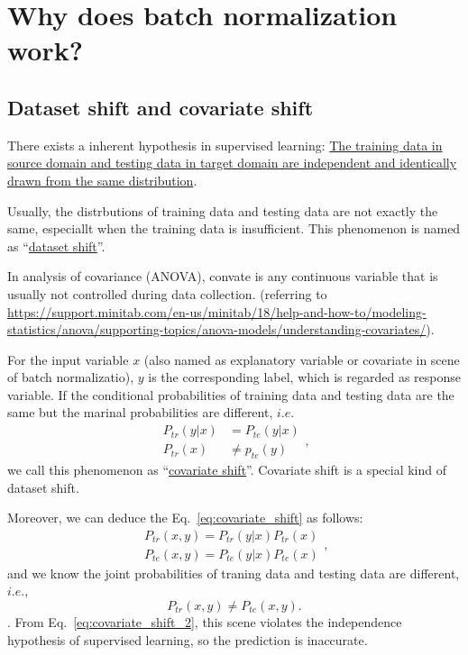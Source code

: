 \documentclass[10pt,onecolumn]{book}
\begin{document}
\section{Why does batch normalization work?}
\subsection{Dataset shift and covariate shift}
There exists a inherent hypothesis in supervised learning: \uline{The training data in source domain and testing data in target domain are independent and identically drawn from the same distribution}. 

Usually, the distrbutions of training data and testing data are not exactly the same, especiallt when the training data is insufficient. This phenomenon is named as ``\uline{dataset shift}''. 

In analysis of covariance (ANOVA), convate is any continuous variable that is usually not controlled during data collection. (referring to \url{https://support.minitab.com/en-us/minitab/18/help-and-how-to/modeling-statistics/anova/supporting-topics/anova-models/understanding-covariates/}). 

For the input variable $x$ (also named as explanatory variable or covariate in scene of batch normalizatio), $y$ is the corresponding label, which is regarded as response variable. If the conditional probabilities of training data and testing data are the same but the marinal probabilities are different, $i.e.$
\begin{equation}\label{eq:covariate_shift}
\begin{split}
P_{tr}(y|x) & = P_{te}(y|x) \\
P_{tr}(x) & \ne p_{te}(y)
\end{split},
\end{equation}
we call this phenomenon as ``\uline{covariate shift}''. Covariate shift is a special kind of dataset shift. 

Moreover, we can deduce the Eq.~\ref{eq:covariate_shift} as follows:
\begin{equation}
\begin{split}
P_{tr}(x, y) = P_{tr}(y|x)P_{tr}(x) \\
P_{te}(x, y) = P_{te}(y|x)P_{te}(x)
\end{split},
\end{equation}
and we know the joint probabilities of traning data and testing data are different, $i. e.$, 
\begin{equation}\label{eq:covariate_shift_2}
P_{tr}(x, y) \ne P_{te}(x, y).
\end{equation}.
From Eq.~\ref{eq:covariate_shift_2}, this scene violates the independence hypothesis of supervised learning, so the prediction is inaccurate.
\end{document}
